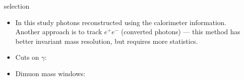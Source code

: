 \begin{frame}{\chib selection}
\begin{itemize}
\item In this study photons reconstructed using the calorimeter information. Another approach is to 
track $e^{+}e^{-}$ (converted photons) --- this method has better invariant mass resolution, but requires more statistics.

\item Cuts on $\gamma$:
\begin{center}
\end{center}

\bigskip

\item Dimuon mass windows:
\begin{center}
\end{center}

\end{itemize}
\end{frame}

